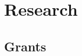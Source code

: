 \documentclass[11pt]{article}
\begin{document}


\section*{Research}

\subsection*{Grants}
\end{document}
